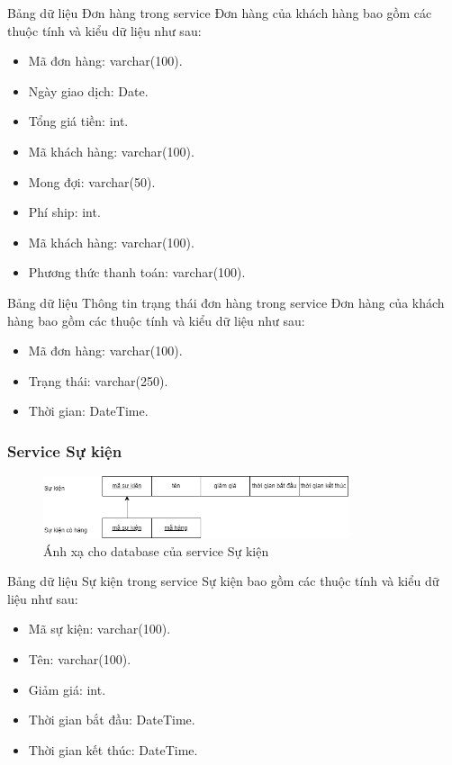 Bảng dữ liệu Đơn hàng trong service Đơn hàng của khách hàng bao gồm các thuộc tính và kiểu dữ liệu như sau:
\begin{itemize}
	\item Mã đơn hàng: varchar(100).
	\item Ngày giao dịch: Date.
	\item Tổng giá tiền: int.
	\item Mã khách hàng: varchar(100).
	\item Mong đợi: varchar(50).
	\item Phí ship: int.
	\item Mã khách hàng: varchar(100).
	\item Phương thức thanh toán: varchar(100).
\end{itemize}

Bảng dữ liệu Thông tin trạng thái đơn hàng trong service Đơn hàng của khách hàng bao gồm các thuộc tính và kiểu dữ liệu như sau:
\begin{itemize}
	\item Mã đơn hàng: varchar(100).
	\item Trạng thái: varchar(250).
	\item Thời gian: DateTime.
\end{itemize}

\subsubsection{Service Sự kiện}
\begin{figure}[!htp]
	\begin{center}
		\includegraphics[width=0.8\textwidth]{img/database/mapping/mapping-event.png}
		\newline
		\caption{Ánh xạ cho database của service Sự kiện}
	\end{center}
\end{figure}

Bảng dữ liệu Sự kiện trong service Sự kiện bao gồm các thuộc tính và kiểu dữ liệu như sau:
\begin{itemize}
	\item Mã sự kiện: varchar(100).
	\item Tên: varchar(100).
	\item Giảm giá: int.
	\item Thời gian bắt đầu: DateTime.
	\item Thời gian kết thúc: DateTime.
\end{itemize}


